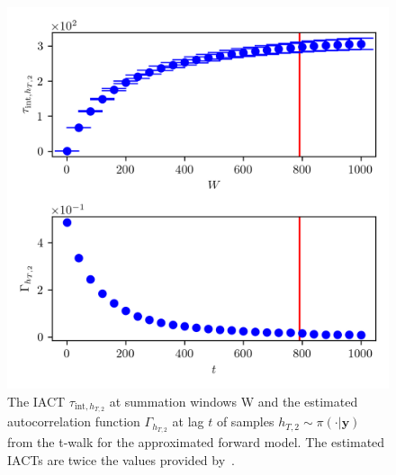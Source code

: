 \begin{figure}[ht!]
	\centering
	\includegraphics{UwerrTauIntTWalk8.png}
	\caption[IACT and autocorrelation function of samples $h_{T,2} \sim \pi(\cdot|\bm{y})$, for approximated model.]{The IACT $\tau_{\text{int},h_{T,2}}$ at summation windows W and the estimated autocorrelation function $\Gamma_{h_{T,2}}$ at lag $t$ of samples $h_{T,2} \sim \pi( \cdot | \bm{y})$ from the t-walk for the approximated forward model.
	The estimated IACTs are twice the values provided by~\cite{drikHesse, UwerrM}.}
	\label{fig:TWalkIATC9}
\end{figure}


